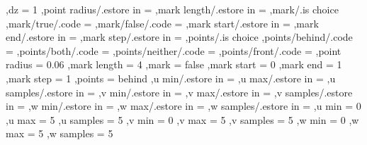 {    ,dz = 1
    ,point radius/.estore in = \pv@vector@pointradius
    ,mark length/.estore in = \pv@vector@marklength
    ,mark/.is choice
    ,mark/true/.code = {\edef\pv@vector@mark{1}}
    ,mark/false/.code = {\edef\pv@vector@mark{0}}
    ,mark start/.estore in = \pv@vector@markstart
    ,mark end/.estore in = \pv@vector@markend
    ,mark step/.estore in = \pv@vector@markstep
    ,points/.is choice
    ,points/behind/.code = {\edef\pv@vector@points{1}}
    ,points/both/.code = {\edef\pv@vector@points{2}}
    ,points/neither/.code = {\edef\pv@vector@points{3}}
    ,points/front/.code = {\edef\pv@vector@points{4}}
    ,point radius = 0.06
    ,mark length = 4
    ,mark = false
    ,mark start = 0
    ,mark end = 1
    ,mark step = 1
    ,points = behind
    ,u min/.estore in = \pv@zbuffer@umin
    ,u max/.estore in = \pv@zbuffer@umax
    ,u samples/.estore in = \pv@zbuffer@usamples
    ,v min/.estore in = \pv@zbuffer@vmin
    ,v max/.estore in = \pv@zbuffer@vmax
    ,v samples/.estore in = \pv@zbuffer@vsamples
    ,w min/.estore in = \pv@zbuffer@wmin
    ,w max/.estore in = \pv@zbuffer@wmax
    ,w samples/.estore in = \pv@zbuffer@wsamples
    ,u min = 0
    ,u max = 5
    ,u samples = 5
    ,v min = 0
    ,v max = 5
    ,v samples = 5
    ,w min = 0
    ,w max = 5
    ,w samples = 5
}